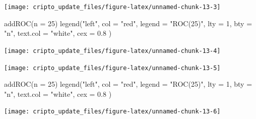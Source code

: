 \documentclass[]{tufte-handout}
\newenvironment{Shaded}{}{}
\newcommand{\AttributeTok}[1]{\textcolor[rgb]{0.49,0.56,0.16}{#1}}
\newcommand{\DecValTok}[1]{\textcolor[rgb]{0.25,0.63,0.44}{#1}}
\newcommand{\FloatTok}[1]{\textcolor[rgb]{0.25,0.63,0.44}{#1}}
\newcommand{\FunctionTok}[1]{\textcolor[rgb]{0.02,0.16,0.49}{#1}}
\newcommand{\NormalTok}[1]{#1}
\newcommand{\OtherTok}[1]{\textcolor[rgb]{0.00,0.44,0.13}{#1}}
\newcommand{\SpecialCharTok}[1]{\textcolor[rgb]{0.25,0.44,0.63}{#1}}
\newcommand{\StringTok}[1]{\textcolor[rgb]{0.25,0.44,0.63}{#1}}
\begin{document}
\texttt{[image: cripto\_update\_files/figure-latex/unnamed-chunk-13-3]}

\begin{Shaded}
\begin{Highlighting}[]
\FunctionTok{addROC}\NormalTok{(}\AttributeTok{n =} \DecValTok{25}\NormalTok{)}
\FunctionTok{legend}\NormalTok{(}\StringTok{"left"}\NormalTok{,}
  \AttributeTok{col =} \StringTok{"red"}\NormalTok{, }\AttributeTok{legend =} \StringTok{"ROC(25)"}\NormalTok{, }\AttributeTok{lty =} \DecValTok{1}\NormalTok{, }\AttributeTok{bty =} \StringTok{"n"}\NormalTok{,}
  \AttributeTok{text.col =} \StringTok{"white"}\NormalTok{, }\AttributeTok{cex =} \FloatTok{0.8}
\NormalTok{)}
\end{Highlighting}
\end{Shaded}

\texttt{[image: cripto\_update\_files/figure-latex/unnamed-chunk-13-4]}

\begin{Shaded}
\end{Shaded}

\texttt{[image: cripto\_update\_files/figure-latex/unnamed-chunk-13-5]}

\begin{Shaded}
\begin{Highlighting}[]
\FunctionTok{addROC}\NormalTok{(}\AttributeTok{n =} \DecValTok{25}\NormalTok{)}
\FunctionTok{legend}\NormalTok{(}\StringTok{"left"}\NormalTok{,}
  \AttributeTok{col =} \StringTok{"red"}\NormalTok{, }\AttributeTok{legend =} \StringTok{"ROC(25)"}\NormalTok{, }\AttributeTok{lty =} \DecValTok{1}\NormalTok{, }\AttributeTok{bty =} \StringTok{"n"}\NormalTok{,}
  \AttributeTok{text.col =} \StringTok{"white"}\NormalTok{, }\AttributeTok{cex =} \FloatTok{0.8}
\NormalTok{)}
\end{Highlighting}
\end{Shaded}

\texttt{[image: cripto\_update\_files/figure-latex/unnamed-chunk-13-6]}

\begin{Shaded}
\end{Shaded}
\end{document}
